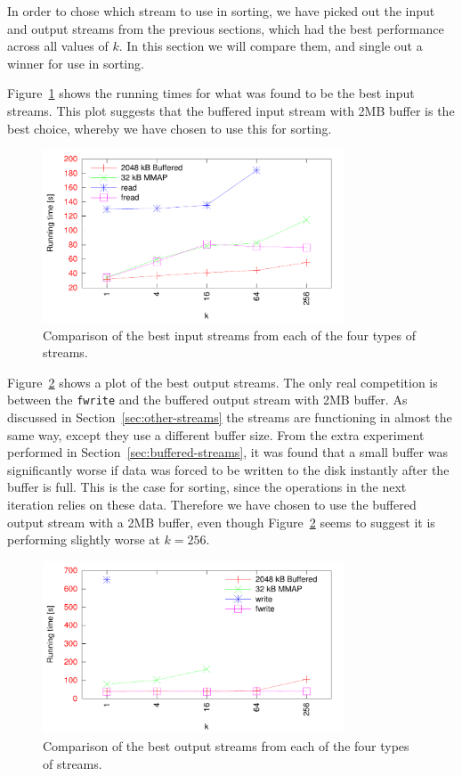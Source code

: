 \documentclass[a4paper,12pt]{article}
\begin{document}
In order to chose which stream to use in sorting, we have picked out
the input and output streams from the previous sections, which had the
best performance across all values of $k$. In this section we will
compare them, and single out a winner for use in sorting.

Figure~\ref{fig:best-input} shows the running times for what was found
to be the best input streams. This plot suggests that the buffered
input stream with 2MB buffer is the best choice, whereby we have
chosen to use this for sorting.

\begin{figure}[h!]
  \centering
  \includegraphics[width=0.8\textwidth]{best_input}
  \caption{Comparison of the best input streams from each of the four
    types of streams.}
  \label{fig:best-input}
\end{figure}

Figure~\ref{fig:best-output} shows a plot of the best output
streams. The only real competition is between the \texttt{fwrite} and
the buffered output stream with 2MB buffer. As discussed in
Section~\ref{sec:other-streams} the streams are functioning in almost
the same way, except they use a different buffer size. From the extra
experiment performed in Section~\ref{sec:buffered-streams}, it was
found that a small buffer was significantly worse if data was forced
to be written to the disk instantly after the buffer is full. This is
the case for sorting, since the operations in the next iteration
relies on these data. Therefore we have chosen to use the buffered
output stream with a 2MB buffer, even though
Figure~\ref{fig:best-output} seems to suggest it is performing
slightly worse at $k = 256$.

\begin{figure}[h!]
  \centering
  \includegraphics[width=0.8\textwidth]{best_output}
  \caption{Comparison of the best output streams from each of the four
    types of streams.}
  \label{fig:best-output}
\end{figure}
\end{document}
